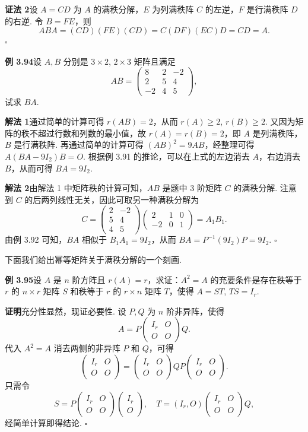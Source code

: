 \documentclass[UTF8, 12pt, fontset=fandol, oneside]{ctexart}
\begin{document}
\noindent\textbf{证法 2}\quad 设 $A=CD$ 为 $A$ 的满秩分解，$E$ 为列满秩阵 $C$ 的左逆，$F$ 是行满秩阵 $D$ 的右逆. 令 $B=FE$，则
\[
ABA=(CD)(FE)(CD)=C(DF)(EC)D=CD=A.
\]
$\square$

\noindent\textbf{例 3.94}\quad 设 $A,B$ 分别是 $3\times 2$, $2\times 3$ 矩阵且满足
\[
AB=\begin{pmatrix}
8&2&-2\\
2&5&4\\
-2&4&5
\end{pmatrix},
\]
试求 $BA$.

\noindent\textbf{解法 1}\quad 通过简单的计算可得 $r(AB)=2$，从而 $r(A)\ge 2$, $r(B)\ge 2$. 又因为矩阵的秩不超过行数和列数的最小值，故 $r(A)=r(B)=2$，即 $A$ 是列满秩阵，$B$ 是行满秩阵. 再通过简单的计算可得 $(AB)^2=9AB$，经整理可得 $A(BA-9I_2)B=O$. 根据例 3.91 的推论，可以在上式的左边消去 $A$，右边消去 $B$，从而可得 $BA=9I_2$.

\noindent\textbf{解法 2}\quad 由解法 1 中矩阵秩的计算可知，$AB$ 是题中 3 阶矩阵 $C$ 的满秩分解. 注意到 $C$ 的后两列线性无关，因此可取另一种满秩分解为
\[
C=\begin{pmatrix}
2&-2\\
5&4\\
4&5
\end{pmatrix}
\begin{pmatrix}
2&1&0\\
-2&0&1
\end{pmatrix}
=A_1B_1.
\]
由例 3.92 可知，$BA$ 相似于 $B_1A_1=9I_2$，从而 $BA=P^{-1}(9I_2)P=9I_2$. $\square$

下面我们给出幂等矩阵关于满秩分解的一个刻画.

\noindent\textbf{例 3.95}\quad 设 $A$ 是 $n$ 阶方阵且 $r(A)=r$，求证：$A^2=A$ 的充要条件是存在秩等于 $r$ 的 $n\times r$ 矩阵 $S$ 和秩等于 $r$ 的 $r\times n$ 矩阵 $T$，使得 $A=ST$, $TS=I_r$.

\noindent\textbf{证明}\quad 充分性显然，现证必要性. 设 $P,Q$ 为 $n$ 阶非异阵，使得
\[
A=P\begin{pmatrix}I_r&O\\O&O\end{pmatrix}Q.
\]
代入 $A^2=A$ 消去两侧的非异阵 $P$ 和 $Q$，可得
\[
\begin{pmatrix}I_r&O\\O&O\end{pmatrix}
=
\begin{pmatrix}I_r&O\\O&O\end{pmatrix}
QP
\begin{pmatrix}I_r&O\\O&O\end{pmatrix}.
\]
只需令
\[
S=P\begin{pmatrix}I_r&O\\O&O\end{pmatrix}\begin{pmatrix}I_r\\O\end{pmatrix},\quad
T=(I_r,O)\begin{pmatrix}I_r&O\\O&O\end{pmatrix}Q,
\]
经简单计算即得结论. $\square$
\end{document}
